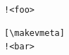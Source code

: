 \documentclass{ltugboat}
\begin{document}
{\tubmakevmeta \verb|!<foo>|}

\begin{verbatim}[\makevmeta]
!<bar>
\end{verbatim}
\end{document}
